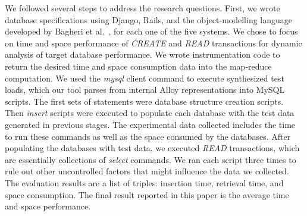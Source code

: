 \documentclass{sig-alternate}
\begin{document}
We followed several steps to address the research questions. First, we wrote database specifications using Django, Rails, and the object-modelling language developed by Bagheri et al.~\cite{trademaker}, for each one of the five systems.
We chose to focus on time and space performance of \emph{CREATE} and \emph{READ} transactions for dynamic analysis of target database performance. We wrote instrumentation code to return the desired time and space consumption data into the map-reduce computation. We used the \emph{mysql} client command to execute synthesized test loads, which our tool parses from internal Alloy representations into MySQL scripts. The first sets of statements were database structure creation scripts. Then \emph{insert} scripts were executed to populate each database with the test data generated in previous stages. The experimental data collected includes the time to run these commands as well as the space consumed by the databases. After populating the databases with test data, we executed \emph{READ} transactions, which are essentially collections of \emph{select} commands.  We ran each script three times to rule out other uncontrolled factors that might influence the data we collected. The evaluation results are a list of triples: insertion time, retrieval time, and space consumption. The final result reported in this paper is the average time and space performance.


 



\end{document}
